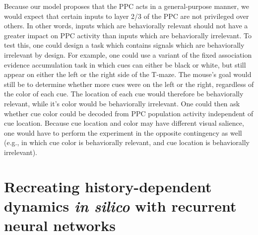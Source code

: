 \bigskip
Because our model proposes that the PPC acts in a general-purpose manner, we would expect that certain inputs to layer 2/3 of the PPC are not privileged over others. In other words, inputs which are behaviorally relevant should not have a greater impact on PPC activity than inputs which are behaviorally irrelevant. To test this, one could design a task which contains signals which are behaviorally irrelevant by design. For example, one could use a variant of the fixed association evidence accumulation task in which cues can either be black or white, but still appear on either the left or the right side of the T-maze. The mouse's goal would still be to determine whether more cues were on the left or the right, regardless of the color of each cue. The location of each cue would therefore be behaviorally relevant, while it's color would be behaviorally irrelevant. One could then ask whether cue color could be decoded from PPC population activity independent of cue location. Because cue location and color may have different visual salience, one would have to perform the experiment in the opposite contingency as well (e.g., in which cue color is behaviorally relevant, and cue location is behaviorally irrelevant).

\section{Recreating history-dependent dynamics \textit{in silico} with recurrent neural networks} \label{discussion:RNN}

